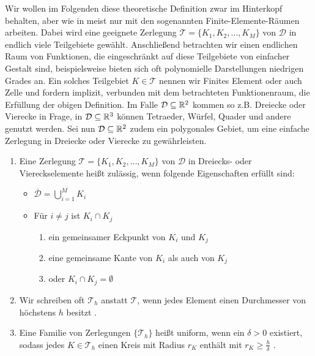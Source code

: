 Wir wollen im Folgenden diese theoretische Definition zwar im Hinterkopf behalten, aber wie in \cite{braess2013finite} meist nur mit den sogenannten Finite-Elemente-Räumen arbeiten. 
Dabei wird eine geeignete Zerlegung $\mathcal{T} = \{K_1,K_2,\dots, K_M \}$ von $\mathcal{D}$ in endlich viele Teilgebiete gewählt. 
Anschließend betrachten wir einen endlichen Raum von Funktionen, die eingeschränkt auf diese Teilgebiete von einfacher Gestalt sind, beispielsweise bieten sich oft polynomielle Darstellungen niedrigen Grades an. 
Ein solches Teilgebiet $K \in \mathcal{T}$ nennen wir Finites Element oder auch Zelle und fordern implizit, verbunden mit dem betrachteten Funktionenraum, die Erfüllung der obigen Definition. \newline
Im Falle $\mathcal{D} \subseteq \mathbb{R}^2$ kommen so z.B. Dreiecke oder Vierecke in Frage, in $\mathcal{D} \subseteq \mathbb{R}^3$ können Tetraeder, Würfel, Quader und andere genutzt werden. \newline
Sei nun $\mathcal{D} \subseteq \mathbb{R} ^2$ zudem ein polygonales Gebiet, um eine einfache Zerlegung in Dreiecke oder Vierecke zu gewährleisten.

\begin{Definition}
	\label{FEMDISC}
	\begin{enumerate}
		\item Eine Zerlegung $\mathcal{T} = \{ K_1,K_2,\dots,K_M\}$ von $\mathcal{D}$ in Dreiecks- oder Viereckselemente heißt zulässig, wenn folgende Eigenschaften erfüllt sind:
		\begin{itemize}
			\item $\overline{\mathcal{D}} = \bigcup_{i=1}^M K_i$
			\item Für $i \neq j$ ist $K_i\cap K_j$
			\begin{enumerate}
				\item ein gemeinsamer Eckpunkt von $K_i$ und $K_j$
				\item eine gemeinsame Kante von $K_i$ als auch von $K_j$
				\item oder $K_i\cap K_j= \emptyset$
			\end{enumerate}
			
		\end{itemize}
		\item Wir schreiben oft $\mathcal{T}_h$ anstatt $\mathcal{T}$, wenn jedes Element einen Durchmesser von höchstens $h$ besitzt .
		\item Eine Familie von Zerlegungen $ \{ \mathcal{T}_h \} $ heißt uniform, wenn ein $ \delta > 0  $ existiert, sodass jedes $ K \in \mathcal{T}_h $ einen Kreis mit Radius $ r_K $ enthält mit $ r_K \geq \frac{h}{\delta} $ .
	\end{enumerate}
\end{Definition}

